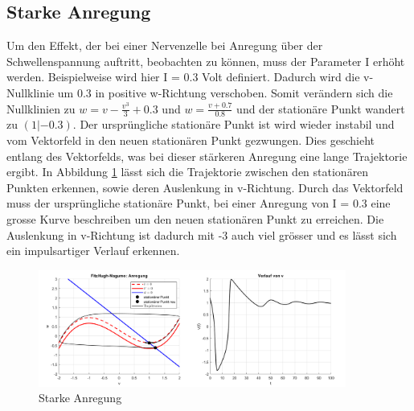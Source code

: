 \begin{refsection}
\subsection{Starke Anregung}
Um den Effekt, der bei einer Nervenzelle bei Anregung über der Schwellenspannung auftritt, beobachten zu können, muss
der Parameter I erhöht werden.
Beispielweise wird hier I = 0.3 Volt definiert.
Dadurch wird die v-Nullklinie um 0.3 in positive w-Richtung verschoben.
Somit verändern sich die Nullklinien zu \( w = v - \frac{v^3}{3} + 0.3\)
und \(w = \frac{v + 0.7}{0.8}\) und der stationäre Punkt wandert zu \((1 |-0.3)\).
Der ursprüngliche stationäre Punkt ist wird wieder instabil und vom Vektorfeld in den neuen stationären Punkt
gezwungen.
Dies geschieht entlang des Vektorfelds, was bei dieser stärkeren Anregung eine lange Trajektorie ergibt.
In Abbildung \ref{fig:starkeAnregung} lässt sich die Trajektorie zwischen den stationären Punkten erkennen, sowie
deren Auslenkung in v-Richtung.
Durch das Vektorfeld muss der ursprüngliche stationäre Punkt, bei einer Anregung von I = 0.3 eine grosse Kurve
beschreiben um den neuen stationären Punkt zu erreichen.
Die Auslenkung in v-Richtung ist dadurch mit -3 auch viel grösser und es lässt sich ein impulsartiger Verlauf erkennen.
\begin{figure}[H]
    \centering
    \includegraphics[width=0.9\textwidth]{papers/nerven/Bilder/starkeAnregung.png}
    \caption{Starke Anregung}
    \label{fig:starkeAnregung}
\end{figure}


\end{refsection}

